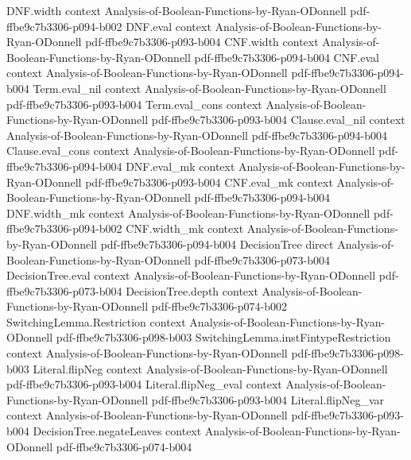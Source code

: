 \begin{lemma}
  {DNF.width}
  {context}
  {Analysis-of-Boolean-Functions-by-Ryan-ODonnell}
  {pdf-ffbe9c7b3306-p094-b002}
\proofstep
  {DNF.eval}
  {context}
  {Analysis-of-Boolean-Functions-by-Ryan-ODonnell}
  {pdf-ffbe9c7b3306-p093-b004}
\proofstep
  {CNF.width}
  {context}
  {Analysis-of-Boolean-Functions-by-Ryan-ODonnell}
  {pdf-ffbe9c7b3306-p094-b004}
\proofstep
  {CNF.eval}
  {context}
  {Analysis-of-Boolean-Functions-by-Ryan-ODonnell}
  {pdf-ffbe9c7b3306-p094-b004}
\proofstep
  {Term.eval_nil}
  {context}
  {Analysis-of-Boolean-Functions-by-Ryan-ODonnell}
  {pdf-ffbe9c7b3306-p093-b004}
\proofstep
  {Term.eval_cons}
  {context}
  {Analysis-of-Boolean-Functions-by-Ryan-ODonnell}
  {pdf-ffbe9c7b3306-p093-b004}
\proofstep
  {Clause.eval_nil}
  {context}
  {Analysis-of-Boolean-Functions-by-Ryan-ODonnell}
  {pdf-ffbe9c7b3306-p094-b004}
\proofstep
  {Clause.eval_cons}
  {context}
  {Analysis-of-Boolean-Functions-by-Ryan-ODonnell}
  {pdf-ffbe9c7b3306-p094-b004}
\proofstep
  {DNF.eval_mk}
  {context}
  {Analysis-of-Boolean-Functions-by-Ryan-ODonnell}
  {pdf-ffbe9c7b3306-p093-b004}
\proofstep
  {CNF.eval_mk}
  {context}
  {Analysis-of-Boolean-Functions-by-Ryan-ODonnell}
  {pdf-ffbe9c7b3306-p094-b004}
\proofstep
  {DNF.width_mk}
  {context}
  {Analysis-of-Boolean-Functions-by-Ryan-ODonnell}
  {pdf-ffbe9c7b3306-p094-b002}
\proofstep
  {CNF.width_mk}
  {context}
  {Analysis-of-Boolean-Functions-by-Ryan-ODonnell}
  {pdf-ffbe9c7b3306-p094-b004}
\proofstep
  {DecisionTree}
  {direct}
  {Analysis-of-Boolean-Functions-by-Ryan-ODonnell}
  {pdf-ffbe9c7b3306-p073-b004}
\proofstep
  {DecisionTree.eval}
  {context}
  {Analysis-of-Boolean-Functions-by-Ryan-ODonnell}
  {pdf-ffbe9c7b3306-p073-b004}
\proofstep
  {DecisionTree.depth}
  {context}
  {Analysis-of-Boolean-Functions-by-Ryan-ODonnell}
  {pdf-ffbe9c7b3306-p074-b002}
\proofstep
  {SwitchingLemma.Restriction}
  {context}
  {Analysis-of-Boolean-Functions-by-Ryan-ODonnell}
  {pdf-ffbe9c7b3306-p098-b003}
\proofstep
  {SwitchingLemma.instFintypeRestriction}
  {context}
  {Analysis-of-Boolean-Functions-by-Ryan-ODonnell}
  {pdf-ffbe9c7b3306-p098-b003}
\proofstep
  {Literal.flipNeg}
  {context}
  {Analysis-of-Boolean-Functions-by-Ryan-ODonnell}
  {pdf-ffbe9c7b3306-p093-b004}
\proofstep
  {Literal.flipNeg_eval}
  {context}
  {Analysis-of-Boolean-Functions-by-Ryan-ODonnell}
  {pdf-ffbe9c7b3306-p093-b004}
\proofstep
  {Literal.flipNeg_var}
  {context}
  {Analysis-of-Boolean-Functions-by-Ryan-ODonnell}
  {pdf-ffbe9c7b3306-p093-b004}
\proofstep
  {DecisionTree.negateLeaves}
  {context}
  {Analysis-of-Boolean-Functions-by-Ryan-ODonnell}
  {pdf-ffbe9c7b3306-p074-b004}

\end{lemma}
